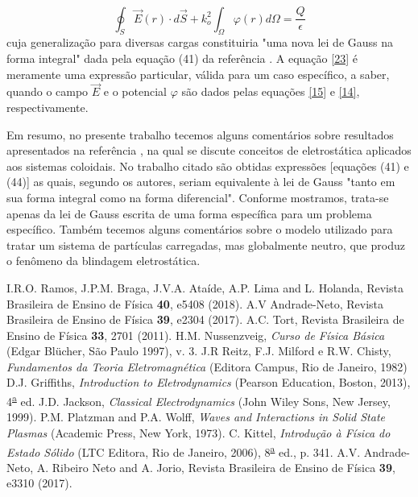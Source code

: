 \documentclass[brazilian,10.7pt,a4paper]{article}
\begin{document}
\begin{multicols}{2}
\\
\begin{equation}\label{23}
\oint_{S}{\vec{E}(r)\cdot d\vec{S}+k^{2}_{o}}\int_{\Omega}{\varphi(r)d\Omega}=\frac{Q}{\epsilon}
\end{equation}
cuja generalização para diversas cargas constituiria "uma nova lei de Gauss na forma integral" dada pela equação (41) da referência \cite{ramos}. A equação \eqref{23} é meramente uma expressão particular, válida para um caso específico, a saber, quando o campo $\vec{E}$ e o potencial $\varphi$ são dados pelas equações \eqref{15} e \eqref{14}, respectivamente.
\par Em resumo, no presente trabalho tecemos alguns comentários sobre resultados apresentados na referência \cite{ramos}, na qual se discute conceitos de eletrostática aplicados aos sistemas coloidais. No trabalho citado são obtidas expressões [equações (41) e (44)] as quais, segundo os autores, seriam equivalente à lei de Gauss "tanto em sua forma integral como na forma diferencial". Conforme mostramos, trata-se apenas da lei de Gauss escrita de uma forma específica para um problema específico. Também tecemos alguns comentários sobre o modelo utilizado para tratar um sistema de partículas carregadas, mas globalmente neutro, que produz o fenômeno da blindagem eletrostática.
\\
\begin{thebibliography}{10}
I.R.O. Ramos, J.P.M. Braga, J.V.A. Ataíde, A.P. Lima and L. Holanda, Revista Brasileira de Ensino de Física \textbf{40}, e5408 (2018).
A.V Andrade-Neto, Revista Brasileira de Ensino de Física \textbf{39}, e2304 (2017).
A.C. Tort, Revista Brasileira de Ensino de Física \textbf{33}, 2701 (2011).
H.M. Nussenzveig, \textit{Curso de Física Básica} (Edgar Blücher, São Paulo 1997), v. 3.
J.R Reitz, F.J. Milford e R.W. Chisty, \textit{Fundamentos da Teoria Eletromagnética} (Editora Campus, Rio de Janeiro, 1982)
D.J. Griffiths, \textit{Introduction to Eletrodynamics} (Pearson Education, Boston, 2013), 4\textsuperscript{\underline{a}} ed.
J.D. Jackson, \textit{Classical Electrodynamics} (John Wiley Sons, New Jersey, 1999).
P.M. Platzman and P.A. Wolff, \textit{Waves and Interactions in Solid State Plasmas} (Academic Press, New York, 1973).
C. Kittel, \textit{Introdução à Física do Estado Sólido} (LTC Editora, Rio de Janeiro, 2006), 8\textsuperscript{\underline{a}} ed., p. 341.
A.V. Andrade-Neto, A. Ribeiro Neto and A. Jorio, Revista Brasileira de Ensino de Física \textbf{39}, e3310 (2017).
\end{thebibliography}
\end{multicols}
\end{document}
